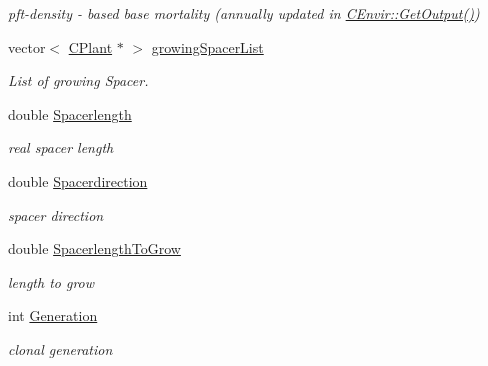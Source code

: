 \begin{DoxyCompactItemize}
\begin{DoxyCompactList}\small\item\em pft-\/density -\/ based base mortality (annually updated in \mbox{\hyperlink{class_c_envir_a0327292c6ae32487c4fdde023f4302d5}{C\+Envir\+::\+Get\+Output()}}) \end{DoxyCompactList}\item 
\mbox{\label{class_c_plant_a9b5628f2be93537e40854163a64f84a7}} 
vector$<$ \mbox{\hyperlink{class_c_plant}{C\+Plant}} $\ast$ $>$ \mbox{\hyperlink{class_c_plant_a9b5628f2be93537e40854163a64f84a7}{growing\+Spacer\+List}}
\begin{DoxyCompactList}\small\item\em List of growing Spacer. \end{DoxyCompactList}\item 
\mbox{\label{class_c_plant_a092e24ced7e34fea929b9052be7fcf22}} 
double \mbox{\hyperlink{class_c_plant_a092e24ced7e34fea929b9052be7fcf22}{Spacerlength}}
\begin{DoxyCompactList}\small\item\em real spacer length \end{DoxyCompactList}\item 
\mbox{\label{class_c_plant_ac2dde78768981780f31a3f1b3cb123d9}} 
double \mbox{\hyperlink{class_c_plant_ac2dde78768981780f31a3f1b3cb123d9}{Spacerdirection}}
\begin{DoxyCompactList}\small\item\em spacer direction \end{DoxyCompactList}\item 
\mbox{\label{class_c_plant_a2ae900661d34fd71f521d27cb975198b}} 
double \mbox{\hyperlink{class_c_plant_a2ae900661d34fd71f521d27cb975198b}{Spacerlength\+To\+Grow}}
\begin{DoxyCompactList}\small\item\em length to grow \end{DoxyCompactList}\item 
\mbox{\label{class_c_plant_a04b662ffff21d1dc66082594a3695c27}} 
int \mbox{\hyperlink{class_c_plant_a04b662ffff21d1dc66082594a3695c27}{Generation}}
\begin{DoxyCompactList}\small\item\em clonal generation \end{DoxyCompactList}\end{DoxyCompactItemize}
